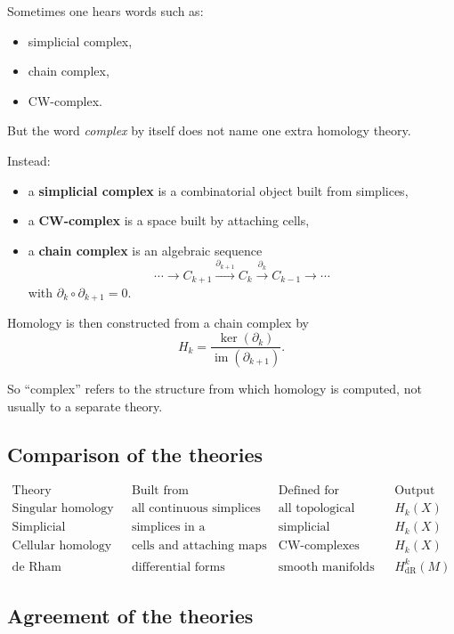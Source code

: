 \documentclass[12pt,a4paper]{article}
\theoremstyle{notespace}
\begin{document}
Sometimes one hears words such as:

\begin{itemize}
	\item simplicial complex,
	\item chain complex,
	\item CW-complex.
\end{itemize}

But the word \emph{complex} by itself does not name one extra homology theory.

Instead:

\begin{itemize}
	\item a \textbf{simplicial complex} is a combinatorial object built from simplices,
	\item a \textbf{CW-complex} is a space built by attaching cells,
	\item a \textbf{chain complex} is an algebraic sequence
	\[
	\cdots \to C_{k+1}\xrightarrow{\partial_{k+1}} C_k\xrightarrow{\partial_k} C_{k-1}\to\cdots
	\]
	with \(\partial_k\circ\partial_{k+1}=0\).
\end{itemize}

Homology is then constructed from a chain complex by
\[
H_k=\frac{\ker(\partial_k)}{\operatorname{im}(\partial_{k+1})}.
\]

So ``complex'' refers to the structure from which homology is computed, not usually to a separate theory.

\subsection{ Comparison of the theories}

\[
\begin{array}{c|c|c|c}
	\text{Theory} & \text{Built from} & \text{Defined for} & \text{Output} \\
	\hline
	\text{Singular homology} & \text{all continuous simplices} & \text{all topological spaces} & H_k(X) \\[4pt]
	\text{Simplicial homology} & \text{simplices in a triangulation} & \text{simplicial complexes} & H_k(X) \\[4pt]
	\text{Cellular homology} & \text{cells and attaching maps} & \text{CW-complexes} & H_k(X) \\[4pt]
	\text{de Rham cohomology} & \text{differential forms} & \text{smooth manifolds} & H^k_{\mathrm{dR}}(M)
\end{array}
\]

\subsection{ Agreement of the theories}
\end{document}

